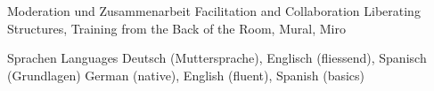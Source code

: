 \begin{cvskills}
  \cvskill
	{
			{ Moderation und Zusammenarbeit }
			{ Facilitation and Collaboration }
	} %
	{Liberating Structures, Training from the Back of the Room, Mural, Miro} %

  \cvskill
    {
    		{ Sprachen }
    		{ Languages }
    } %
    {
    		{ Deutsch (Muttersprache), Englisch (fliessend), Spanisch (Grundlagen) }
    		{ German (native), English (fluent), Spanish (basics) }
    } %

\end{cvskills}
